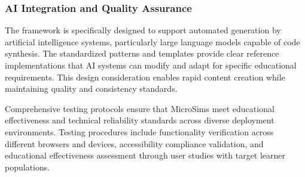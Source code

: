 \subsubsection{AI Integration and Quality Assurance}

The framework is specifically designed to support automated generation by artificial intelligence systems, particularly large language models capable of code synthesis. The standardized patterns and templates provide clear reference implementations that AI systems can modify and adapt for specific educational requirements. This design consideration enables rapid content creation while maintaining quality and consistency standards.

Comprehensive testing protocols ensure that MicroSims meet educational effectiveness and technical reliability standards across diverse deployment environments. Testing procedures include functionality verification across different browsers and devices, accessibility compliance validation, and educational effectiveness assessment through user studies with target learner populations.
